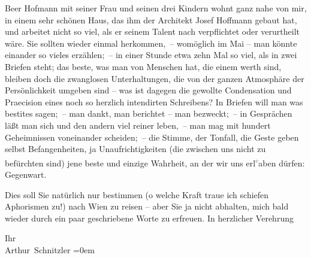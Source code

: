 \pstart
           {\pb}Beer Hofmann mit seiner Frau und seinen drei Kindern wohnt ganz nahe
					von mir, in einem sehr schönen Haus, das ihm der Architekt Josef
                  Hoffmann gebaut hat, und arbeitet nicht so viel, als er seinem Talent nach
               verpflichtet oder verurtheilt wäre. Sie sollten wieder einmal herkommen, – womöglich
               im Mai – man könnte einander so vieles erzählen; – in einer Stunde etwa zehn Mal so
               viel, als in zwei Briefen steht; das beste, was man von Menschen hat, die einem werth
               sind, bleiben doch die zwanglosen Unterhaltungen, die von der ganzen Atmosphäre der
               Persönlichkeit umgeben sind – was ist dagegen die gewollte Condensation und
               Praecision eines noch so herzlich intendirten Schreibens? {\pb}In Briefen will man was besti{\geminationm}tes sagen; – man dankt, man berichtet – man bezweckt; –
               in Gesprächen läßt man sich und den andern viel reiner leben, – man mag mit hundert
               Geheimnissen voneinander scheiden; – die Stimme, der Tonfall, die Geste geben selbst
               Befangenheiten, ja Unaufrichtigkeiten (die zwischen uns nicht zu befürchten sind)
               jene beste und einzige Wahrheit, an der wir uns erl\substVorne{}\textsuperscript{\textcolor{gray}{e}}\substDazwischen{}a\substHinten{}ben dürfen: Gegenwart.\pend
           
\pstart
           Dies soll Sie natürlich nur bestimmen (o welche Kraft traue ich schiefen Aphorismen
               zu!) nach Wien zu reisen – aber Sie ja nicht
               abhalten, mich bald wieder durch ein paar geschriebene Worte zu erfreuen. In
               herzlicher Verehrung\pend
           
\pstart
           Ihr{\\[\baselineskip]}\spacefill\mbox{Arthur Schnitzler}\pend
           \leftskip=0em{}\endnumbering{}  
      